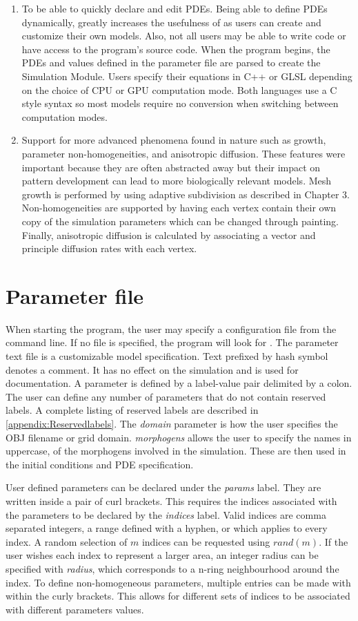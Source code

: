 \begin{enumerate}
	\item To be able to quickly declare and edit PDEs. Being able to define PDEs dynamically, greatly increases the usefulness of \ProgramName{} as users can create and customize their own models. Also, not all users may be able to write code or have access to the program's source code. When the program begins, the PDEs and values defined in the parameter file are parsed to create the Simulation Module. Users specify their equations in C++ or GLSL depending on the choice of CPU or GPU computation mode. Both languages use a C style syntax so most models require no conversion when switching between computation modes.
			
	\item Support for more advanced phenomena found in nature such as growth, parameter non-homogeneities, and anisotropic diffusion. These features were important because they are often abstracted away but their impact on pattern development can lead to more biologically relevant models. Mesh growth is performed by using adaptive subdivision as described in Chapter 3. Non-homogeneities are supported by having each vertex contain their own copy of the simulation parameters which can be changed through painting. Finally, anisotropic diffusion is calculated by associating a vector and principle diffusion rates with each vertex.
\end{enumerate}

\section{Parameter file}
When starting the program, the user may specify a configuration file from the command line. If no file is specified, the program will look for . The parameter text file is a customizable model specification. Text prefixed by hash symbol denotes a comment. It has no effect on the simulation and is used for documentation. A parameter is defined by a label-value pair delimited by a colon. The user can define any number of parameters that do not contain reserved labels. A complete listing of reserved labels are described in \ref{appendix:Reservedlabels}. The \textit{domain} parameter is how the user specifies the OBJ filename or grid domain. \textit{morphogens} allows the user to specify the names in uppercase, of the morphogens involved in the simulation. These are then used in the initial conditions and PDE specification. 

User defined parameters can be declared under the \textit{params} label. They are written inside a pair of curl brackets. This requires the indices associated with the parameters to be declared by the \textit{indices} label. Valid indices are comma separated integers, a range defined with a hyphen, or  which applies to every index. A random selection of $m$ indices can be requested using $rand(m)$. If the user wishes each index to represent a larger area, an integer radius can be specified with \textit{radius}, which corresponds to a n-ring neighbourhood around the index. To define non-homogeneous parameters, multiple entries can be made with within the curly brackets. This allows for different sets of indices to be associated with different parameters values.

